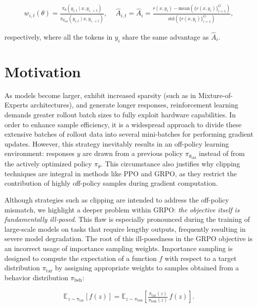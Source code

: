 \begin{align}
    w_{i,t}(\theta) = \frac{ \pi_{\theta}(y_{i,t} \mid x, y_{i,<t}) }{ \pi_{\theta_\text{old}}(y_{i,t} \mid x, y_{i,<t}) }, \quad\ 
    \widehat{A}_{i,t} = \widehat{A}_{i} = \frac{ r(x, y_i) - \mathrm{mean}\left( \{ r(x, y_i) \}_{i=1}^G \right) }{ \mathrm{std}\left( \{ r(x, y_i) \}_{i=1}^G \right) },
\end{align}

respectively, where all the tokens in $y_i$ share the same advantage as $\widehat{A}_{i}$.

\section{Motivation}
\label{sec:motivation}

As models become larger, exhibit increased sparsity (such as in Mixture-of-Experts architectures), and generate longer responses, reinforcement learning demands greater rollout batch sizes to fully exploit hardware capabilities. In order to enhance sample efficiency, it is a widespread approach to divide these extensive batches of rollout data into several mini-batches for performing gradient updates. However, this strategy inevitably results in an off-policy learning environment: responses $y$ are drawn from a previous policy $\pi_{\theta_\text{old}}$ instead of from the actively optimized policy $\pi_\theta$. This circumstance also justifies why clipping techniques are integral in methods like PPO and GRPO, as they restrict the contribution of highly off-policy samples during gradient computation.

Although strategies such as clipping are intended to address the off-policy mismatch, we highlight a deeper problem within GRPO: \textit{the objective itself is fundamentally ill-posed}. This flaw is especially pronounced during the training of large-scale models on tasks that require lengthy outputs, frequently resulting in severe model degradation. The root of this ill-posedness in the GRPO objective is an incorrect usage of importance sampling weights. Importance sampling is designed to compute the expectation of a function $f$ with respect to a target distribution $\pi_\text{tar}$ by assigning appropriate weights to samples obtained from a behavior distribution $\pi_\text{beh}$:

\begin{align}
\mathbb{E}_{z \sim \pi_\text{tar}} \left[ f(z) \right] = \mathbb{E}_{z \sim \pi_\text{beh}} \left[ \frac{ \pi_\text{tar} (z) }{ \pi_\text{beh} (z)} \, f(z) \right].
\end{align}

